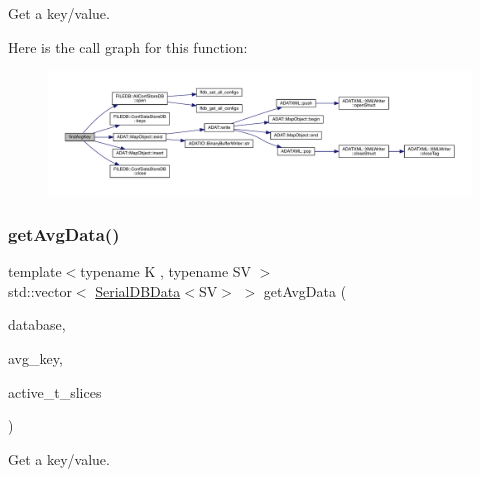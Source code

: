 Get a key/value. 

Here is the call graph for this function\+:
\nopagebreak
\begin{figure}[H]
\begin{center}
\leavevmode
\includegraphics[width=350pt]{d2/d95/adat-devel_2main_2dbutil_2dbavgsrc_8cc_a6b84b2344f757e5dab22137c76ba2912_cgraph}
\end{center}
\end{figure}
\mbox{\label{adat-devel_2main_2dbutil_2dbavgsrc_8cc_ae56af043dd66c496a9f847b9b5a6d604}} 
\subsubsection{\texorpdfstring{getAvgData()}{getAvgData()}}
{\footnotesize\ttfamily template$<$typename K , typename SV $>$ \\
std\+::vector$<$ \mbox{\hyperlink{classADATIO_1_1SerialDBData}{Serial\+D\+B\+Data}}$<$SV$>$ $>$ get\+Avg\+Data (\begin{DoxyParamCaption}\item[{\mbox{\hyperlink{classFILEDB_1_1AllConfStoreMultipleDB}{All\+Conf\+Store\+Multiple\+DB}}$<$ \mbox{\hyperlink{classADATIO_1_1SerialDBKey}{Serial\+D\+B\+Key}}$<$ K $>$, \mbox{\hyperlink{classADATIO_1_1SerialDBData}{Serial\+D\+B\+Data}}$<$ SV $>$ $>$ \&}]{database,  }\item[{\mbox{\hyperlink{classADATIO_1_1SerialDBKey}{Serial\+D\+B\+Key}}$<$ K $>$ \&}]{avg\+\_\+key,  }\item[{const std\+::vector$<$ int $>$ \&}]{active\+\_\+t\+\_\+slices }\end{DoxyParamCaption})}



Get a key/value. 

